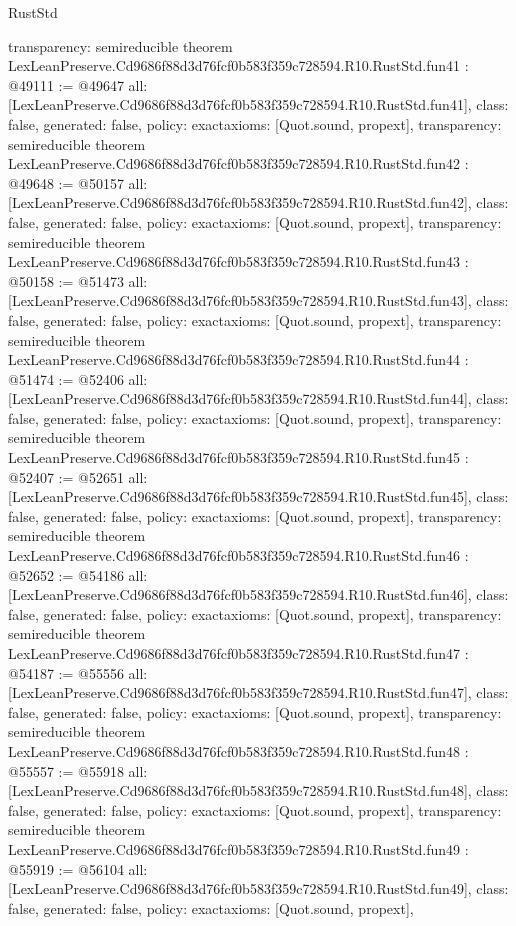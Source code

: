 \begin{lexlean}{RustStd}
\begin{coremodule}
{  transparency: semireducible
}
theorem LexLeanPreserve.Cd9686f88d3d76fcf0b583f359c728594.R10.RustStd.fun41 : @49111 := @49647 {
  all: [LexLeanPreserve.Cd9686f88d3d76fcf0b583f359c728594.R10.RustStd.fun41],
  class: false,
  generated: false,
  policy: exact{axioms: [Quot.sound, propext]},
  transparency: semireducible
}
theorem LexLeanPreserve.Cd9686f88d3d76fcf0b583f359c728594.R10.RustStd.fun42 : @49648 := @50157 {
  all: [LexLeanPreserve.Cd9686f88d3d76fcf0b583f359c728594.R10.RustStd.fun42],
  class: false,
  generated: false,
  policy: exact{axioms: [Quot.sound, propext]},
  transparency: semireducible
}
theorem LexLeanPreserve.Cd9686f88d3d76fcf0b583f359c728594.R10.RustStd.fun43 : @50158 := @51473 {
  all: [LexLeanPreserve.Cd9686f88d3d76fcf0b583f359c728594.R10.RustStd.fun43],
  class: false,
  generated: false,
  policy: exact{axioms: [Quot.sound, propext]},
  transparency: semireducible
}
theorem LexLeanPreserve.Cd9686f88d3d76fcf0b583f359c728594.R10.RustStd.fun44 : @51474 := @52406 {
  all: [LexLeanPreserve.Cd9686f88d3d76fcf0b583f359c728594.R10.RustStd.fun44],
  class: false,
  generated: false,
  policy: exact{axioms: [Quot.sound, propext]},
  transparency: semireducible
}
theorem LexLeanPreserve.Cd9686f88d3d76fcf0b583f359c728594.R10.RustStd.fun45 : @52407 := @52651 {
  all: [LexLeanPreserve.Cd9686f88d3d76fcf0b583f359c728594.R10.RustStd.fun45],
  class: false,
  generated: false,
  policy: exact{axioms: [Quot.sound, propext]},
  transparency: semireducible
}
theorem LexLeanPreserve.Cd9686f88d3d76fcf0b583f359c728594.R10.RustStd.fun46 : @52652 := @54186 {
  all: [LexLeanPreserve.Cd9686f88d3d76fcf0b583f359c728594.R10.RustStd.fun46],
  class: false,
  generated: false,
  policy: exact{axioms: [Quot.sound, propext]},
  transparency: semireducible
}
theorem LexLeanPreserve.Cd9686f88d3d76fcf0b583f359c728594.R10.RustStd.fun47 : @54187 := @55556 {
  all: [LexLeanPreserve.Cd9686f88d3d76fcf0b583f359c728594.R10.RustStd.fun47],
  class: false,
  generated: false,
  policy: exact{axioms: [Quot.sound, propext]},
  transparency: semireducible
}
theorem LexLeanPreserve.Cd9686f88d3d76fcf0b583f359c728594.R10.RustStd.fun48 : @55557 := @55918 {
  all: [LexLeanPreserve.Cd9686f88d3d76fcf0b583f359c728594.R10.RustStd.fun48],
  class: false,
  generated: false,
  policy: exact{axioms: [Quot.sound, propext]},
  transparency: semireducible
}
theorem LexLeanPreserve.Cd9686f88d3d76fcf0b583f359c728594.R10.RustStd.fun49 : @55919 := @56104 {
  all: [LexLeanPreserve.Cd9686f88d3d76fcf0b583f359c728594.R10.RustStd.fun49],
  class: false,
  generated: false,
  policy: exact{axioms: [Quot.sound, propext]},
}
\end{coremodule}
\end{lexlean}
